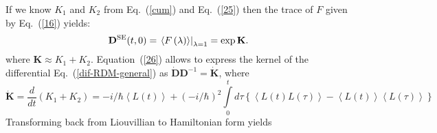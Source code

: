 \documentclass[12pt,twoside,a4paper]{report}
\begin{document}
If we know $K_1$ and $K_2$ from Eq.~(\ref{cum}) and Eq.~(\ref{25}) then 
the trace of $F$ given by  Eq.~(\ref{16}) yields:  
\begin{equation} 
\mathbf{D}
       ^{\rm SE}
       {\left( 
         t,0
         \right) }
                    =  
                       \left. 
                           \left\langle 
                                F
                                \left( \mathbf{ \lambda }\right) 
                          \right\rangle 
                       \right|
                              _{\mathbf{\lambda}=1}
                   =
                       \exp \mathbf{K}. 
\label{26} 
\end{equation} 
where $\mathbf{K}\approx K_1+K_2$. 
Equation~(\ref{26}) allows to express the kernel of the differential
Eq.~(\ref{dif-RDM-general}) as  
$%
\mathbf{\dot{D}}
{\mathbf{D}}^{-1}
                 =
                      \mathbf{\dot{K}}
$, %
where 
\begin{equation} 
\mathbf{\dot{K}}
                  =
                      \frac d{dt}
                      \left( K_1+K_2\right) 
                  = - i/\hbar 
                      \left\langle 
                           L\left( t\right) 
                      \right\rangle 
                    + \left( -i/\hbar \right)^2
                      \int\limits_0^t d\tau 
                          \left\{ 
                              \left\langle 
                                  L\left( t    \right) 
                                  L\left( \tau \right) 
                             \right\rangle 
                           - \left\langle 
                                  L\left( t    \right) 
                             \right\rangle 
                             \left\langle 
                                  L\left( \tau \right) 
                             \right\rangle 
                          \right\}  \label{28} 
\end{equation} 
Transforming back from Liouvillian to Hamiltonian form  yields
\end{document}
